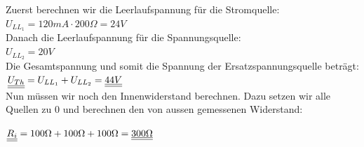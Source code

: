 																				\begin{center}
																					\fix
																				\end{center}
																				\iend
																				\beginbsp																				Zuerst berechnen wir die Leerlaufspannung für die Stromquelle: \\
																				$U_{LL_1} = 120mA \cdot 200 \Omega = 24V$ \\
																				Danach die Leerlaufspannung für die Spannungsquelle: \\
																				$ U_{LL_2} = 20V$\\
																				Die Gesamtspannung und somit die Spannung der Ersatzspannungsquelle beträgt: \\
																				$\underline{\underline{U_{Th}}} = U_{LL_1} + U_{LL_2} = \underline{\underline{44V}}$ \\

																				Nun müssen wir noch den Innenwiderstand berechnen. Dazu setzen wir alle Quellen zu 0 und berechnen den von aussen gemessenen Widerstand:\\
																				\begin{center}
																					\fix
																				\end{center}
																									$\underline{\underline{R_i}} = 100\Omega + 100\Omega  + 100\Omega  = \underline{\underline{300 \Omega}} $
																				\iend

